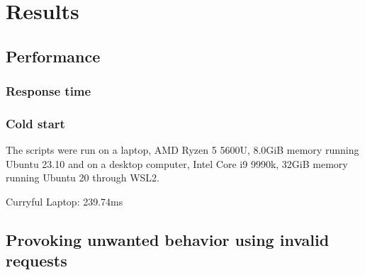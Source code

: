 \documentclass[a4paper]{article}
\begin{document}
\section{Results}
\subsection{Performance}
\subsubsection{Response time}

\subsubsection{Cold start}
The scripts were run on a laptop, AMD Ryzen 5 5600U, 8.0GiB memory running Ubuntu 23.10 and on a desktop computer,
Intel Core i9 9990k, 32GiB memory running Ubuntu 20 through WSL2.

Curryful Laptop: 239.74ms

\subsection{Provoking unwanted behavior using invalid requests}
\end{document}
